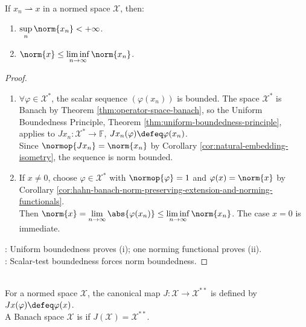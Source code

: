 \begin{proposition} \label{prop:weakly-convergent-sequences-bounded} \\
If $x_n\rightharpoonup x$ in a normed space $\mathcal{X}$, then:
\begin{enumerate}[label=(\roman*)]
\setlength{\itemsep}{0pt}
\item $\sup\limits_n\norm{x_n}<+\infty$.
\item $\norm{x}\leq\liminf\limits_{n\to\infty}\norm{x_n}$.
\end{enumerate}
\begin{proof}
\begin{enumerate}[label=(\roman*)]
\setlength{\itemsep}{0pt}
\item $\forall\varphi\in\mathcal{X}^*$, the scalar sequence $(\varphi(x_n))$ is bounded. The space $\mathcal{X}^*$ is Banach by Theorem \ref{thm:operator-space-banach}, so the Uniform Boundedness Principle, Theorem \ref{thm:uniform-boundedness-principle}, applies to $Jx_n:\mathcal{X}^*\to\mathbb{F}$, $Jx_n(\varphi)\defeq\varphi(x_n)$.\\
Since $\normop{Jx_n}=\norm{x_n}$ by Corollary \ref{cor:natural-embedding-isometry}, the sequence is norm bounded.
\item If $x\neq0$, choose $\varphi\in\mathcal{X}^*$ with $\normop{\varphi}=1$ and $\varphi(x)=\norm{x}$ by Corollary \ref{cor:hahn-banach-norm-preserving-extension-and-norming-functionals}.\\
Then $\norm{x}=\lim\limits_{n\to\infty}\abs{\varphi(x_n)}\leq\liminf\limits_{n\to\infty}\norm{x_n}$. The case $x=0$ is immediate.
\end{enumerate}
: Uniform boundedness proves (i); one norming functional proves (ii).\\
: Scalar-test boundedness forces norm boundedness.
\end{proof}
\end{proposition}

\begin{definition} \label{def:reflexive-banach-space} \\
For a normed space $\mathcal{X}$, the canonical map $J:\mathcal{X}\to\mathcal{X}^{**}$ is defined by $Jx(\varphi)\defeq\varphi(x)$.\\
A Banach space $\mathcal{X}$ is  if $J(\mathcal{X})=\mathcal{X}^{**}$.
\end{definition}

